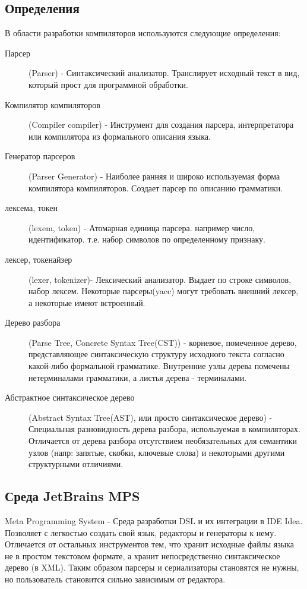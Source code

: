 \documentclass[a4paper,12pt,titlepage]{extarticle}
\begin{document}
\subsection{Определения}
В области разработки компиляторов используются следующие определения:
\begin{description}
  \item[Парсер] (Parser) -
    Синтаксический анализатор. Транслирует исходный текст в вид, который прост
    для программной обработки.
  \item[Компилятор компиляторов] (Compiler compiler) -
	Инструмент для создания парсера, интерпретатора или компилятора из формального
	описания языка.
  \item[Генератор парсеров] (Parser Generator) -
  	Наиболее ранняя и широко используемая форма компилятора компиляторов.
  	Создает парсер по описанию грамматики. 
  \item[лексема, токен] (lexem, token) - 
  	Атомарная единица парсера. например число, идентификатор. т.е. набор
  	символов по определенному признаку.
  \item[лексер, токенайзер] (lexer, tokenizer)-
  	Лексический анализатор. Выдает по строке символов, набор лексем. Некоторые
  	парсеры(yacc) могут требовать внешний лексер, а некоторые имеют встроенный.
  \item[Дерево разбора] (Parse Tree, Concrete Syntax Tree(CST)) -
  	корневое, помеченное дерево, представляющее синтаксическую структуру
  	исходного текста согласно какой-либо формальной грамматике. Внутренние узлы
  	дерева помечены нетерминалами грамматики, а листья дерева - терминалами.
  \item[Абстрактное синтаксическое дерево] (Abstract Syntax Tree(AST), или
  просто синтаксическое дерево) - Специальная разновидность дерева разбора,
  используемая в компиляторах. Отличается от дерева разбора отсутствием
  необязательных для семантики узлов (напр: запятые, скобки, ключевые слова) и
  некоторыми другими структурными отличиями.
\end{description}

\subsection{Среда JetBrains MPS}
Meta Programming System - Среда разработки DSL и их интеграции в IDE Idea.
Позволяет с легкостью создать свой язык, редакторы и генераторы к нему.
Отличается от остальных инструментов тем, что хранит исходные файлы языка не в
простом текстовом формате, а хранит непосредственно синтаксическое дерево (в
XML). Таким образом парсеры и сериализаторы становятся не нужны, но
пользователь становится сильно зависимым от редактора.
\end{document}
